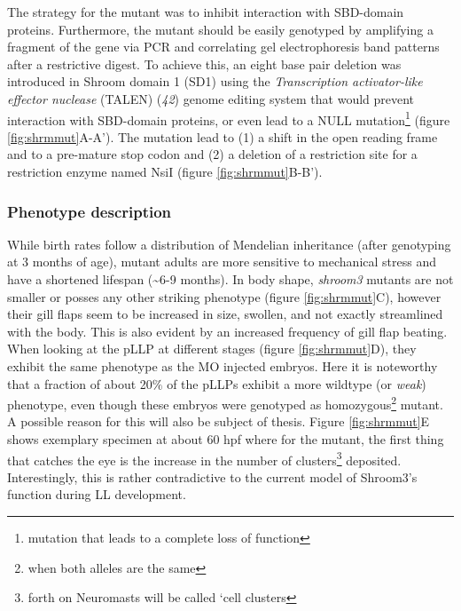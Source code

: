 \documentclass[11pt,singlespacinge,twoside]{reedthesis} %
\begin{document}
The strategy for the mutant was to inhibit interaction with SBD-domain proteins. Furthermore, the mutant should be easily genotyped by amplifying a fragment of the gene via PCR and correlating gel electrophoresis band patterns after a restrictive digest. To achieve this, an eight base pair deletion was introduced in Shroom domain 1 (SD1) using the \emph{Transcription activator-like effector nuclease} (TALEN) (\emph{42}) genome editing system that would prevent interaction with SBD-domain proteins, or even lead to a NULL mutation\footnote{mutation that leads to a complete loss of function} (figure \ref{fig:shrmmut}A-A'). The mutation lead to (1) a shift in the open reading frame and to a pre-mature stop codon and (2) a deletion of a restriction site for a restriction enzyme named NsiI (figure \ref{fig:shrmmut}B-B').

\hypertarget{intro-phen}{%
\subsubsection{Phenotype description}\label{intro-phen}}

While birth rates follow a distribution of Mendelian inheritance (after genotyping at 3 months of age), mutant adults are more sensitive to mechanical stress and have a shortened lifespan (\textasciitilde{}6-9 months). In body shape, \emph{shroom3} mutants are not smaller or posses any other striking phenotype (figure \ref{fig:shrmmut}C), however their gill flaps seem to be increased in size, swollen, and not exactly streamlined with the body. This is also evident by an increased frequency of gill flap beating. When looking at the pLLP at different stages (figure \ref{fig:shrmmut}D), they exhibit the same phenotype as the MO injected embryos. Here it is noteworthy that a fraction of about 20\(\%\) of the pLLPs exhibit a more wildtype (or \emph{weak}) phenotype, even though these embryos were genotyped as homozygous\footnote{when both alleles are the same} mutant. A possible reason for this will also be subject of thesis. Figure \ref{fig:shrmmut}E shows exemplary specimen at about 60 hpf where for the mutant, the first thing that catches the eye is the increase in the number of clusters\footnote{forth on Neuromasts will be called `cell clusters} deposited. Interestingly, this is rather contradictive to the current model of Shroom3's function during LL development.
\end{document}
